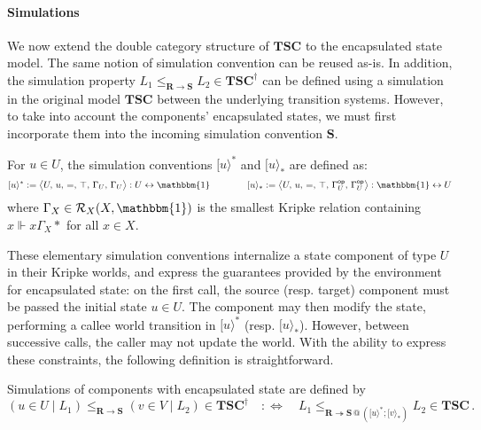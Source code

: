 \documentclass[acmsmall,screen,review,anonymous]{acmart}
\newcommand{\kw}[1]{\ensuremath{ \mathsf{#1} }}
\begin{document}
\paragraph{Simulations} %

We now extend the double category structure of $\mathbf{TSC}$
to the encapsulated state model.
The same notion of simulation convention can be reused as-is.
In addition,
the simulation property
$L_1 \le_{\mathbf{R} \rightarrow \mathbf{S}} L_2 \in \mathbf{TSC}^\dagger$
can be defined using a simulation
in the original model $\mathbf{TSC}$
between the underlying transition systems.
However,
to take into account the components' encapsulated states,
we must first incorporate them into
the incoming simulation convention $\mathbf{S}$.

\begin{definition}
For $u \in U$,
the simulation conventions
$[ u \rangle^*$ and
$[ u \rangle_*$ are defined as:
\[
  [ u \rangle^* :=
    \big\langle U,\, u,\, {=},\, \top,\, \Gamma_U,\, \Gamma_U \big\rangle
    : U \leftrightarrow \mathbbm{1}
  \qquad \qquad
  [ u \rangle_* :=
    \big\langle U,\, u,\, {=},\, \top,\, \Gamma_U^\kw{op},\, \Gamma_U^\kw{op} \big\rangle
    : \mathbbm{1} \leftrightarrow U
\]
where $\Gamma_X \in \mathcal{R}_X(X, \mathbbm{1})$
is the smallest Kripke relation containing $x \Vdash x \mathrel{\Gamma_X} *$ for all $x \in X$.
\end{definition}

These elementary simulation conventions
internalize a state component of type $U$ in their Kripke worlds,
and express the guarantees provided by the environment
for encapsulated state:
on the first call, the source (resp. target) component
must be passed the initial state $u \in U$.
The component may then modify the state,
performing a callee world transition
in $[ u \rangle^*$ (resp. $[ u \rangle_*$).
However,
between successive calls,
the caller may not update the world.
With the ability to express these constraints,
the following definition is straightforward.

\begin{definition} \label{def:ssim} %
Simulations of components with encapsulated state are defined by
\[
  (u \in U \mid L_1)
  \le_{\mathbf{R} \rightarrow \mathbf{S}}
  (v \in V \mid L_2)
  \in \mathbf{TSC}^\dagger
  \quad:\Leftrightarrow\quad
  L_1
  \le_{\mathbf{R} \twoheadrightarrow
       \mathbf{S} \mathbin@ ([ u \rangle^* \mathbin; [ v \rangle_*)}
  L_2
  \in
  \mathbf{TSC}
  \,.
\]
\end{definition}
\end{document}
